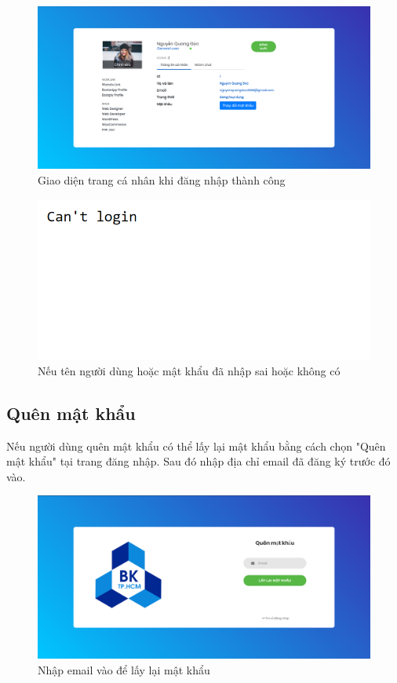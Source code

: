 \documentclass[a4paper]{article}
\begin{document}
	\begin{figure}[H]
		\centering
		\includegraphics[scale=0.36]{profile_manager.png}
		\caption{Giao diện trang cá nhân khi đăng nhập thành công}
		\label{F:profile_manager_login}
	\end{figure}
	
	\begin{figure}[H]
		\centering
		\includegraphics[scale=1]{can_not_login.png}
		\caption{Nếu tên người dùng hoặc mật khẩu đã nhập sai hoặc không có}
		\label{F:can_not_login}
	\end{figure}
	
	\subsection{Quên mật khẩu}
	Nếu người dùng quên mật khẩu có thể lấy lại mật khẩu bằng cách chọn "Quên mật khẩu" tại trang đăng nhập. Sau đó nhập địa chỉ email đã đăng ký trước đó vào.\linebreak
	
	\begin{figure}[H]
		\centering
		\includegraphics[scale=0.36]{forget_password.png}
		\caption{Nhập email vào để lấy lại mật khẩu}
		\label{F:forget_password}
	\end{figure}
	
\end{document}
